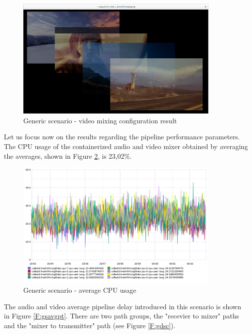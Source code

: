 \begin{figure}[!htb]
\begin{center}
\includegraphics[width=0.90\textwidth]{./images/outAVmix.png}
\caption{Generic scenario - video mixing configuration result}
\label{F:outVMix}
\end{center}
\end{figure}

\vbox{Let us focus now on the results regarding the pipeline performance parameters. The CPU usage of the containerized audio and video mixer obtained by averaging the averages, shown in Figure \ref{F:gsavgcpu}, is 23,02\%.}

\begin{figure}[!htb]
\begin{center}
\includegraphics[width=0.90\textwidth]{./images/testAVMix/AVMixCPU.png}
\caption{Generic scenario - average CPU usage}
\label{F:gsavgcpu}
\end{center}
\end{figure}

\vbox{The audio and video average pipeline delay introduced in this scenario is shown in Figure \ref{F:gsavgpt}. There are two path groups, the "recevier to mixer" paths and the "mixer to transmitter" path (see Figure \ref{F:gdsc}).}

